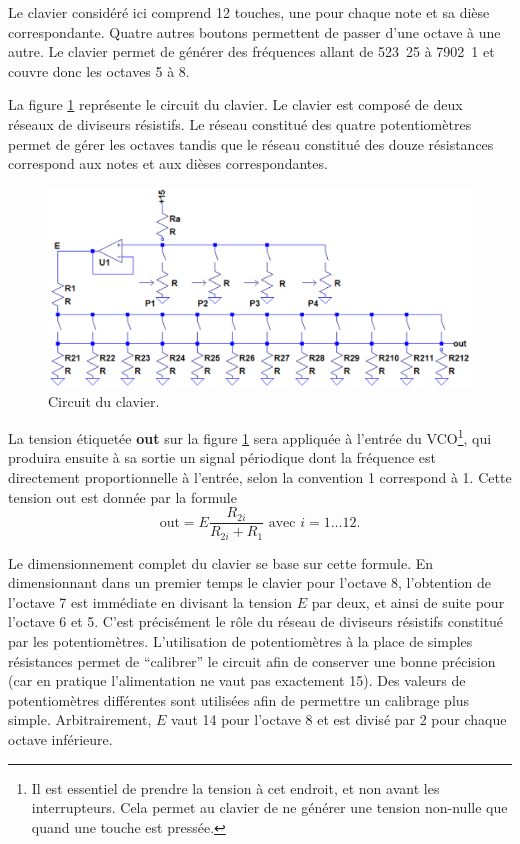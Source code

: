 
Le clavier considéré ici comprend 12 touches, une pour
chaque note et sa dièse correspondante. Quatre autres
boutons permettent de passer d'une octave à une autre.
Le clavier permet de générer des fréquences allant de
\unit{523.25}{\hertz} à \unit{7902.1}{\hertz} et couvre
donc les octaves 5 à 8.

La figure \ref{fig:keyboard-circuit} représente le
circuit du clavier. Le clavier est composé de deux
réseaux de diviseurs résistifs. Le réseau constitué
des quatre potentiomètres permet de gérer les octaves
tandis que le réseau constitué des douze résistances
correspond aux notes et aux dièses correspondantes.

\begin{figure}[ht]
	\centering
	\includegraphics[scale=0.5]{img-keyboard/keyboard-circuit.png}
	\caption{Circuit du clavier.}
	\label{fig:keyboard-circuit}
\end{figure}

La tension étiquetée \textbf{out} sur la figure
\ref{fig:keyboard-circuit} sera appliquée à l'entrée
du VCO\footnote{Il est essentiel de prendre la tension à cet
endroit, et non avant les interrupteurs. Cela permet au clavier
de ne générer une tension non-nulle que quand une touche est pressée.},
qui produira ensuite à sa sortie un signal
périodique dont la fréquence est directement 
proportionnelle à l'entrée, selon la convention
\unit{1}{\milli\volt} correspond à \unit{1}{\hertz}. Cette
tension $\text{out}$ est donnée par la formule 
\[ \text{out} = E\frac{R_{2i}}{R_{2i} + R_1} \text{  avec  } i = 1\dots12. \]

Le dimensionnement complet du clavier se base
sur cette formule. En dimensionnant dans un premier
temps le clavier pour l'octave 8, l'obtention
de l'octave 7 est immédiate en divisant la tension
$E$ par deux, et ainsi de suite pour l'octave 6 et 5.
C'est précisément le rôle du réseau de diviseurs
résistifs constitué par les potentiomètres. L'utilisation
de potentiomètres à la place de simples résistances
permet de ``calibrer'' le circuit afin de conserver
une bonne précision (car en pratique l'alimentation
ne vaut pas exactement \unit{15}{\volt}).
Des valeurs de potentiomètres différentes sont utilisées
afin de permettre un calibrage plus simple.
Arbitrairement, $E$ vaut \unit{14}{\volt} pour l'octave
8 et est divisé par 2 pour chaque octave inférieure.

